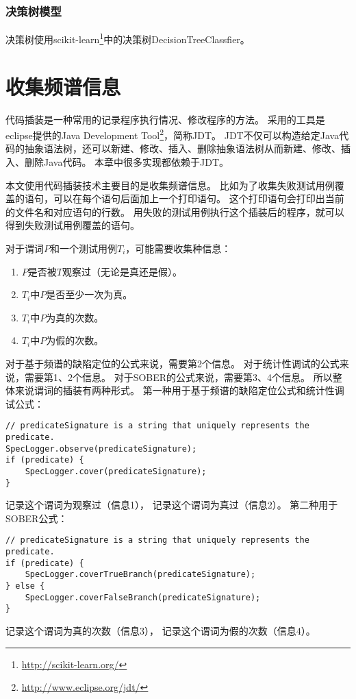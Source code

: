\subsubsection{决策树模型}

决策树使用scikit-learn\footnote{\url{http://scikit-learn.org/}}中的决策树DecisionTreeClassfier。

\section{收集频谱信息}

代码插装是一种常用的记录程序执行情况、修改程序的方法。
采用的工具是eclipse提供的Java Development Tool\footnote{\url{http://www.eclipse.org/jdt/}}，简称JDT。
JDT不仅可以构造给定Java代码的抽象语法树，还可以新建、修改、插入、删除抽象语法树从而新建、修改、插入、删除Java代码。
本章中很多实现都依赖于JDT。

本文使用代码插装技术主要目的是收集频谱信息。
比如为了收集失败测试用例覆盖的语句，可以在每个语句后面加上一个打印语句。
这个打印语句会打印出当前的文件名和对应语句的行数。
用失败的测试用例执行这个插装后的程序，就可以得到失败测试用例覆盖的语句。

对于谓词$P$和一个测试用例$T_i$，可能需要收集种信息：
\begin{enumerate}
\item $P$是否被$T$观察过（无论是真还是假）。
\item $T_i$中$P$是否至少一次为真。
\item $T_i$中$P$为真的次数。
\item $T_i$中$P$为假的次数。
\end{enumerate}

对于基于频谱的缺陷定位的公式来说，需要第2个信息。
对于统计性调试的公式来说，需要第1、2个信息。
对于SOBER的公式来说，需要第3、4个信息。
所以整体来说谓词的插装有两种形式。
第一种用于基于频谱的缺陷定位公式和统计性调试公式：
\lstset{language=Java}
\begin{lstlisting}
// predicateSignature is a string that uniquely represents the predicate.
SpecLogger.observe(predicateSignature);
if (predicate) {
    SpecLogger.cover(predicateSignature);
}
\end{lstlisting}
记录这个谓词为观察过（信息1），
记录这个谓词为真过（信息2）。
第二种用于SOBER公式：
\lstset{language=Java}
\begin{lstlisting}
// predicateSignature is a string that uniquely represents the predicate.
if (predicate) {
    SpecLogger.coverTrueBranch(predicateSignature);
} else {
    SpecLogger.coverFalseBranch(predicateSignature);
}
\end{lstlisting}
记录这个谓词为真的次数（信息3），
记录这个谓词为假的次数（信息4）。

